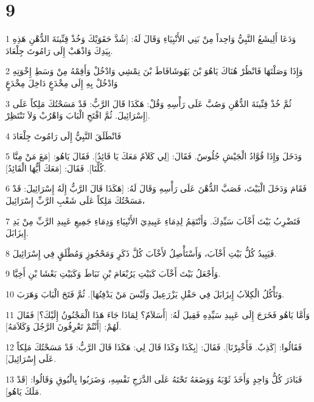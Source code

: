 \chapter{9}

\par 1 وَدَعَا أَلِيشَعُ النَّبِيُّ وَاحِداً مِنْ بَنِي الأَنْبِيَاءِ وَقَالَ لَهُ: [شُدَّ حَقَوَيْكَ وَخُذْ قِنِّينَةَ الدُّهْنِ هَذِهِ بِيَدِكَ وَاذْهَبْ إِلَى رَامُوتَ جِلْعَادَ.
\par 2 وَإِذَا وَصَلْتَهَا فَانْظُرْ هُنَاكَ يَاهُوَ بْنَ يَهُوشَافَاطَ بْنَ نِمْشِي وَادْخُلْ وَأَقِمْهُ مِنْ وَسَطِ إِخْوَتِهِ وَادْخُلْ بِهِ إِلَى مِخْدَعٍ دَاخِلَ مِخْدَعٍ
\par 3 ثُمَّ خُذْ قِنِّينَةَ الدُّهْنِ وَصُبَّ عَلَى رَأْسِهِ وَقُلْ: هَكَذَا قَالَ الرَّبُّ: قَدْ مَسَحْتُكَ مَلِكاً عَلَى إِسْرَائِيلَ. ثُمَّ افْتَحِ الْبَابَ وَاهْرُبْ وَلاَ تَنْتَظِرْ].
\par 4 فَانْطَلَقَ النَّبِيُّ إِلَى رَامُوتَ جِلْعَادَ
\par 5 وَدَخَلَ وَإِذَا قُوَّادُ الْجَيْشِ جُلُوسٌ. فَقَالَ: [لِي كَلاَمٌ مَعَكَ يَا قَائِدُ]. فَقَالَ يَاهُو: [مَعَ مَنْ مِنَّا كُلِّنَا]. فَقَالَ: [مَعَكَ أَيُّهَا الْقَائِدُ].
\par 6 فَقَامَ وَدَخَلَ الْبَيْتَ، فَصَبَّ الدُّهْنَ عَلَى رَأْسِهِ وَقَالَ لَهُ: [هَكَذَا قَالَ الرَّبُّ إِلَهُ إِسْرَائِيلَ: قَدْ مَسَحْتُكَ مَلِكاً عَلَى شَعْبِ الرَّبِّ إِسْرَائِيلَ،
\par 7 فَتَضْرِبُ بَيْتَ أَخْآبَ سَيِّدِكَ. وَأَنْتَقِمُ لِدِمَاءِ عَبِيدِيَ الأَنْبِيَاءِ وَدِمَاءِ جَمِيعِ عَبِيدِ الرَّبِّ مِنْ يَدِ إِيزَابَلَ.
\par 8 فَيَبِيدُ كُلُّ بَيْتِ أَخْآبَ، وَأَسْتَأْصِلُ لأَخْآبَ كُلَّ ذَكَرٍ وَمَحْجُوزٍ وَمُطْلَقٍ فِي إِسْرَائِيلَ.
\par 9 وَأَجْعَلُ بَيْتَ أَخْآبَ كَبَيْتِ يَرُبْعَامَ بْنِ نَبَاطَ وَكَبَيْتِ بَعْشَا بْنِ أَخِيَّا.
\par 10 وَتَأْكُلُ الْكِلاَبُ إِيزَابَلَ فِي حَقْلِ يَزْرَعِيلَ وَلَيْسَ مَنْ يَدْفِنُهَا]. ثُمَّ فَتَحَ الْبَابَ وَهَرَبَ.
\par 11 وَأَمَّا يَاهُو فَخَرَجَ إِلَى عَبِيدِ سَيِّدِهِ فَقِيلَ لَهُ: [أَسَلاَمٌ؟ لِمَاذَا جَاءَ هَذَا الْمَجْنُونُ إِلَيْكَ؟] فَقَالَ لَهُمْ: [أَنْتُمْ تَعْرِفُونَ الرَّجُلَ وَكَلاَمَهُ].
\par 12 فَقَالُوا: [كَذِبٌ. فَأَخْبِرْنَا]. فَقَالَ: [بِكَذَا وَكَذَا قَالَ لِي: هَكَذَا قَالَ الرَّبُّ: قَدْ مَسَحْتُكَ مَلِكاً عَلَى إِسْرَائِيلَ].
\par 13 فَبَادَرَ كُلُّ وَاحِدٍ وَأَخَذَ ثَوْبَهُ وَوَضَعَهُ تَحْتَهُ عَلَى الدَّرَجِ نَفْسِهِ، وَضَرَبُوا بِالْبُوقِ وَقَالُوا: [قَدْ مَلَكَ يَاهُو].
